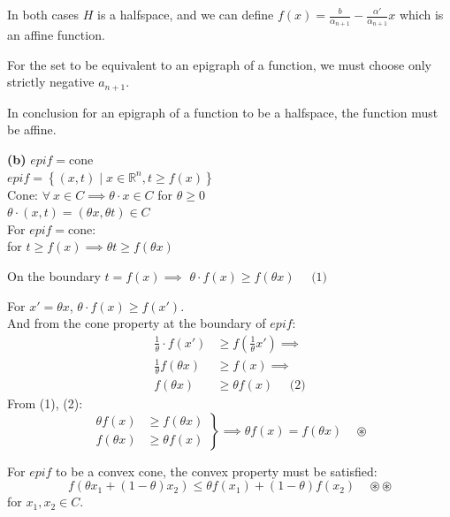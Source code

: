 \documentclass{article}
\begin{document}
\noindent In both cases $H$ is a halfspace, and we can define $f(x) = \frac{b}{\alpha_{n+1}} - \frac{\alpha'}{\alpha_{n+1}}x$ which is an affine function.

For the set to be equivalent to an epigraph of a function, we must choose only strictly negative $a_{n+1}$.

In conclusion for an epigraph of a function to be a halfspace, the function must be affine.

\textbf{(b)} \noindent $epi f = \text{cone}$ \\

\noindent $epi f = \left\{ (x, t) \mid x \in \mathbb{R}^n, t \geq f(x) \right\}$ \\

\noindent Cone: $\forall \ x \in C \implies \theta \cdot x \in C$ for $\theta \geq 0$ \\

\noindent $\theta \cdot (x, t) =  (\theta x, \theta t) \in C$ \\

\noindent For $epi f = \text{cone}$: \\

\noindent for $t \geq f(x) \implies \theta t \geq f(\theta x)$


On the boundary $t = f(x) \implies$
$    \theta \cdot f(x) \geq f(\theta x) \quad \text{ (1)}
$

\noindent For $x' = \theta x$, $\theta \cdot f(x) \geq f(x')$. \\
And from the cone property at the boundary of $epi f$:
\begin{align*}
    \frac{1}{\theta} \cdot f(x') &\geq f\left(\frac{1}{\theta} x'\right) \implies \\
    \frac{1}{\theta} f(\theta x) &\geq f(x) \implies \\
    f(\theta x) &\geq \theta f(x) \quad \text{ (2)}
\end{align*}
\noindent From (1), (2):
\begin{equation*}
    \left.
    \begin{aligned}
    \theta f(x) &\geq f(\theta x) \\
    f(\theta x) &\geq \theta f(x)
    \end{aligned}
    \right\} \implies \theta f(x) = f(\theta x) \quad \circledast
\end{equation*}

\noindent For $epi f$ to be a convex cone, the convex property must be satisfied:
\begin{equation*}
    f(\theta x_1 + (1-\theta)x_2) \leq \theta f(x_1) + (1-\theta) f(x_2) \quad \circledast\circledast
\end{equation*}
\noindent for $x_1, x_2 \in C$.
\end{document}
